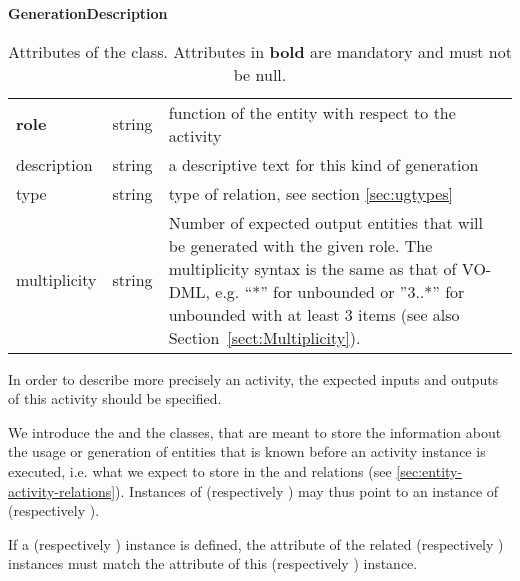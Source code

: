 \begin{table}[ht]
\small
{}\textwidth
\textbf{\normalsize GenerationDescription}\vspace{0.25em}\\
\begin{tabulary}{1.0\textwidth}{llL}
\toprule
{} &  & \\
\midrule
\textbf{role} & string & function of the entity with respect to the activity \\
description  & string & a descriptive text for this kind of generation \\
type & string   & type of relation, see section \ref{sec:ugtypes} \\
multiplicity & string & Number of expected output entities that will be generated with the given role. The multiplicity syntax is the same as that of VO-DML, e.g. “*” for unbounded or ”3..*” for unbounded with at least 3 items (see also Section~\ref{sect:Multiplicity}). \\
\bottomrule
\end{tabulary}
\caption[Attributes of the  class]{Attributes of the  class. Attributes in \textbf{bold} are mandatory and must not be null.}
\label{tab:wasgeneratedbydescription}
\end{table}


In order to describe more precisely an activity, the expected inputs and outputs of this activity should be specified.

We introduce the  and the  classes, that are meant to store the information about the usage or generation of entities that is known before an activity instance is executed, i.e. what we expect to store in the  and  relations (see \ref{sec:entity-activity-relations}). 
Instances of  (respectively ) may thus point to an instance of  (respectively ).

If a  (respectively ) instance is defined, the  attribute of the related  (respectively ) instances must match the  attribute of this  (respectively ) instance.


